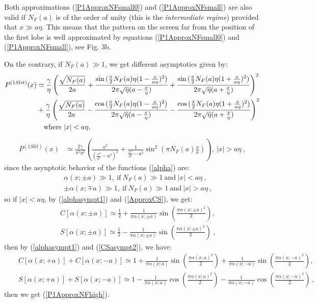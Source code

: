\documentclass[12pt]{article}   %
\begin{document}
Both approximations (\ref{P1ApproxNFsmall0}) and
(\ref{P1ApproxNFsmall}) are also valid if $N_F(a)$ is of the order
of unity (this is the \textit{intermediate regime}) provided that
$x\gg a\eta$. This means that the pattern on the screen far from
the position of the first lobe is well approximated by  equations
(\ref{P1ApproxNFsmall0}) and (\ref{P1ApproxNFsmall}), see Fig. 3b.

On the contrary, if $N_F(a)\gg 1$, we get different asymptotics
given by:
\begin{align}\label{P1ApproxNFhigh}
P^{(1
Slit)}(x) & \simeq\frac{\gamma}{\eta}\left(\frac{\sqrt{N_F(a)}}{2a}+
\frac{\sin{(\frac{\pi}{2}N_F(a)\eta(1-\frac{x}{a\eta})^2)}}{2\pi\sqrt{\eta}(a-\frac{x}{\eta})}
+\frac{\sin{(\frac{\pi}{2}N_F(a)\eta(1+\frac{x}{a\eta})^2)}}{2\pi\sqrt{\eta}(a+\frac{x}{\eta})}\right)^2
{}\nonumber\\{}&+\frac{\gamma}{\eta}\left(\frac{\sqrt{N_F(a)}}{2a}-
\frac{\cos{(\frac{\pi}{2}N_F(a)\eta(1-\frac{x}{a\eta})^2)}}{2\pi\sqrt{\eta}(a-\frac{x}{\eta})}
-\frac{\cos{(\frac{\pi}{2}N_F(a)\eta(1+\frac{x}{a\eta})^2)}}{2\pi\sqrt{\eta}(a+\frac{x}{\eta})}\right)^2 \nonumber\\
& \quad {\rm where} \ |x|<a\eta,
\end{align}
\begin{align}\label{P1ApproxNFhigh2}
P^{(1 Slit)}(x)&
\simeq\frac{2\gamma}{\pi^2\eta^2}\left(\frac{a^2}{(\frac{x^2}{\eta^2}-a^2)^2}+\frac{1}{\frac{x^2}{\eta^2}-a^2}\sin^2{(\pi
N_F(a) \frac{x}{a})}\right) ,\ |x|>a\eta\ ,
\end{align}
since the asynptotic behavior of the functions (\ref{alpha}) are:
\begin{eqnarray}
&&\alpha(x;\pm a)\gg1,\ \mathrm{if}\ N_F(a)\gg1\ \mathrm{and}\ |x|<a\eta\ ,\label{alphasympt1}
{}\\{}&& \pm\alpha(x;\mp a)\gg1,\ \mathrm{if}\ N_F(a)\gg1\ \mathrm{and}\ |x|>a\eta\ ,\label{alphasympt2}
\end{eqnarray}
so if $|x|<a\eta$, by (\ref{alphasympt1}) and (\ref{ApproxCS}), we get:
\begin{eqnarray}\label{CSasympt2}
&& C[\alpha(x;\pm a)]\simeq \frac{1}{2} + \frac{1}{\pi\alpha(x;\pm a)}\sin{(\frac{\pi\alpha(x;\pm a)^2}{2})},
{}\nonumber\\{}&& S[\alpha(x;\pm a)]\simeq \frac{1}{2} - \frac{1}{\pi\alpha(x;\pm a)}\sin{(\frac{\pi\alpha(x;\pm a)^2}{2})}\ ,
\end{eqnarray}
then by (\ref{alphasympt1}) and (\ref{CSasympt2}), we have:
\begin{eqnarray*}
&& C[\alpha(x;+a)]+C[\alpha(x;-a)]\simeq 1+\frac{1}{\pi\alpha(x;a)}\sin{(\frac{\pi\alpha(x;a)^2}{2})}
+\frac{1}{\pi\alpha(x;-a)}\sin{(\frac{\pi\alpha(x;-a)^2}{2})},
{}\nonumber\\{}&& S[\alpha(x;+a)]+S[\alpha(x;-a)]\simeq 1-\frac{1}{\pi\alpha(x;a)}\cos{(\frac{\pi\alpha(x;a)^2}{2})}
-\frac{1}{\pi\alpha(x;-a)}\cos{(\frac{\pi\alpha(x;-a)^2}{2})}\ ,
\end{eqnarray*}
then we get (\ref{P1ApproxNFhigh}).
\end{document}
